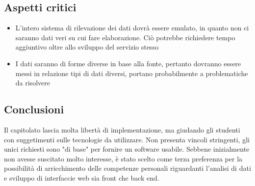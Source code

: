 \subsection{Aspetti critici}
\begin{itemize}
    \item L'intero sistema di rilevazione dei dati dovrà essere emulato, in quanto non ci saranno dati veri su cui fare elaborazione. Ciò potrebbe richiedere tempo aggiuntivo oltre allo sviluppo del servizio stesso
    \item I dati saranno di forme diverse in base alla fonte, pertanto dovranno essere messi in relazione tipi di dati diversi, portano probabilmente a problematiche da risolvere
\end{itemize}
\subsection{Conclusioni}
Il capitolato lascia molta libertà di implementazione, ma giudando gli studenti con suggetimenti sulle tecnologie da utilizzare.
Non presenta vincoli stringenti, gli unici richiesti sono "di base" per fornire un software usabile.
Sebbene inizialmente non avesse suscitato molto interesse, è stato scelto come terza preferenza per la possibilità di arricchimento delle competenze personali
riguardanti l'analisi di dati e sviluppo di interfaccie web sia front che back end.